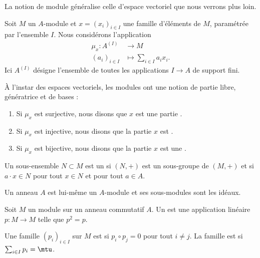 \begin{remark}
    La notion de module généralise celle d'espace vectoriel que nous verrons plus loin.
\end{remark}

Soit \( M\) un \( A\)-module et \( x=(x_i)_{i\in I}\) une famille d'éléments de \( M\), paramétrée par l'ensemble \( I\). Nous considérons l'application
\begin{equation}
    \begin{aligned}
        \mu_x\colon A^{(I)}&\to M \\
        (a_i)_{i\in I}&\mapsto \sum_{i\in I}a_ix_i.
    \end{aligned}
\end{equation}
Ici \( A^{(I)}\) désigne l'ensemble de toutes les applications \( I\to A\) de support fini.  

\begin{definition}      \label{DefBasePouyKj}
    À l'instar des espaces vectoriels, les modules ont une notion de partie libre, génératrice et de bases :
    \begin{enumerate}
        \item
            Si \( \mu_x\) est surjective, nous disons que \( x\) est une partie .
        \item
            Si \( \mu_x\) est injective, nous disons que la partie \( x\) est .
        \item
            Si \( \mu_x\) est bijective, nous disons que la partie \( x\) est une .
    \end{enumerate}
\end{definition}

\begin{definition}
  Un sous-ensemble \( N\subset M\) est un  si \( (N,+)\) est un sous-groupe de \( (M,+)\) et si \( a\cdot x\in N\) pour tout \( x\in N\) et pour tout \( a\in A\).
\end{definition}

\begin{example}
    Un anneau \( A\) est lui-même un \( A\)-module et ses sous-modules sont les idéaux.
\end{example}

\begin{definition}
    Soit \( M\) un module sur un anneau commutatif \( A\). Un  est une application linéaire \( p\colon M\to M\) telle que \( p^2=p\).

    Une famille \( (p_i)_{i\in I}\) sur \( M\) est  si \( p_i\circ p_j=0\) pour tout \( i\neq j\). La famille est  si \( \sum_{i\in I}p_i=\mtu\).
\end{definition}

